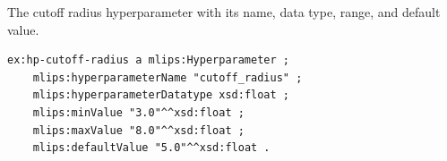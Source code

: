 The cutoff radius hyperparameter with its name, data type, range, and default value.
\begin{lstlisting}[language=turtle]
ex:hp-cutoff-radius a mlips:Hyperparameter ;
    mlips:hyperparameterName "cutoff_radius" ;
    mlips:hyperparameterDatatype xsd:float ;
    mlips:minValue "3.0"^^xsd:float ;
    mlips:maxValue "8.0"^^xsd:float ;
    mlips:defaultValue "5.0"^^xsd:float .
\end{lstlisting}
